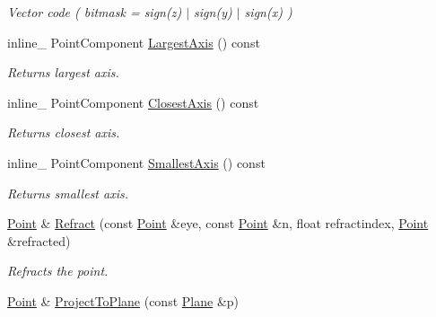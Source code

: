 \begin{DoxyCompactItemize}
\begin{DoxyCompactList}\small\item\em Vector code ( bitmask = sign(z) $\vert$ sign(y) $\vert$ sign(x) ) \end{DoxyCompactList}\item 
inline\+\_\+ Point\+Component \hyperlink{classOpcode_1_1Point_a18ed25491eff888727b497a4554cb1f7}{Largest\+Axis} () const \hypertarget{classOpcode_1_1Point_a18ed25491eff888727b497a4554cb1f7}{}\label{classOpcode_1_1Point_a18ed25491eff888727b497a4554cb1f7}

\begin{DoxyCompactList}\small\item\em Returns largest axis. \end{DoxyCompactList}\item 
inline\+\_\+ Point\+Component \hyperlink{classOpcode_1_1Point_a686db1b0532c7bea52c0855b89729985}{Closest\+Axis} () const \hypertarget{classOpcode_1_1Point_a686db1b0532c7bea52c0855b89729985}{}\label{classOpcode_1_1Point_a686db1b0532c7bea52c0855b89729985}

\begin{DoxyCompactList}\small\item\em Returns closest axis. \end{DoxyCompactList}\item 
inline\+\_\+ Point\+Component \hyperlink{classOpcode_1_1Point_aa01294b61a9af8e6bba2658eeaccc5fa}{Smallest\+Axis} () const \hypertarget{classOpcode_1_1Point_aa01294b61a9af8e6bba2658eeaccc5fa}{}\label{classOpcode_1_1Point_aa01294b61a9af8e6bba2658eeaccc5fa}

\begin{DoxyCompactList}\small\item\em Returns smallest axis. \end{DoxyCompactList}\item 
\hyperlink{classOpcode_1_1Point}{Point} \& \hyperlink{classOpcode_1_1Point_a3bcdc1e2ed3aaed2b2c1f894e8d9f7c3}{Refract} (const \hyperlink{classOpcode_1_1Point}{Point} \&eye, const \hyperlink{classOpcode_1_1Point}{Point} \&n, float refractindex, \hyperlink{classOpcode_1_1Point}{Point} \&refracted)\hypertarget{classOpcode_1_1Point_a3bcdc1e2ed3aaed2b2c1f894e8d9f7c3}{}\label{classOpcode_1_1Point_a3bcdc1e2ed3aaed2b2c1f894e8d9f7c3}

\begin{DoxyCompactList}\small\item\em Refracts the point. \end{DoxyCompactList}\item 
\hyperlink{classOpcode_1_1Point}{Point} \& \hyperlink{classOpcode_1_1Point_a199cc7d23f441cb5b4b2c26f019eda07}{Project\+To\+Plane} (const \hyperlink{classOpcode_1_1Plane}{Plane} \&p)\hypertarget{classOpcode_1_1Point_a199cc7d23f441cb5b4b2c26f019eda07}{}\label{classOpcode_1_1Point_a199cc7d23f441cb5b4b2c26f019eda07}


\end{DoxyCompactItemize}
